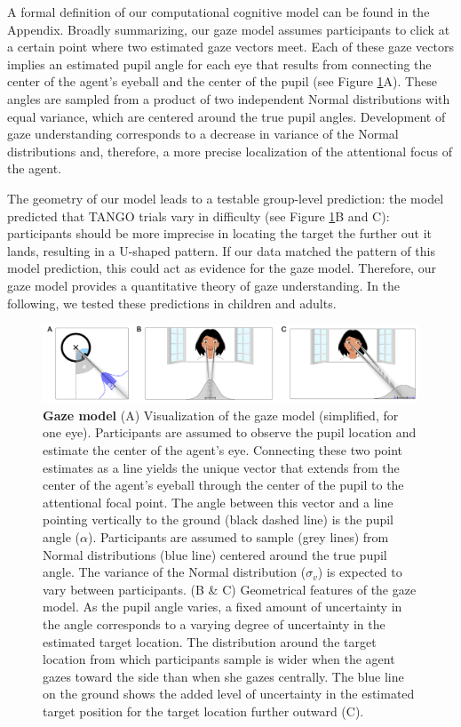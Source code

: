 \documentclass[
  man,mask,floatsintext]{apa7}
\begin{document}
A formal definition of our computational cognitive model can be found in the Appendix. Broadly summarizing, our gaze model assumes participants to click at a certain point where two estimated gaze vectors meet. Each of these gaze vectors implies an estimated pupil angle for each eye that results from connecting the center of the agent's eyeball and the center of the pupil (see Figure \ref{fig:fig2}A). These angles are sampled from a product of two independent Normal distributions with equal variance, which are centered around the true pupil angles. Development of gaze understanding corresponds to a decrease in variance of the Normal distributions and, therefore, a more precise localization of the attentional focus of the agent.

The geometry of our model leads to a testable group-level prediction: the model predicted that TANGO trials vary in difficulty (see Figure \ref{fig:fig2}B and C): participants should be more imprecise in locating the target the further out it lands, resulting in a U-shaped pattern. If our data matched the pattern of this model prediction, this could act as evidence for the gaze model. Therefore, our gaze model provides a quantitative theory of gaze understanding. In the following, we tested these predictions in children and adults.



\begin{figure}

{\centering \includegraphics[width=1\linewidth]{../figures/gazemodel} 

}

\caption{\textbf{Gaze model} (A) Visualization of the gaze model (simplified, for one eye). Participants are assumed to observe the pupil location and estimate the center of the agent's eye. Connecting these two point estimates as a line yields the unique vector that extends from the center of the agent's eyeball through the center of the pupil to the attentional focal point. The angle between this vector and a line pointing vertically to the ground (black dashed line) is the pupil angle (\(\alpha\)). Participants are assumed to sample (grey lines) from Normal distributions (blue line) centered around the true pupil angle. The variance of the Normal distribution (\(\sigma_v\)) is expected to vary between participants. (B \& C) Geometrical features of the gaze model. As the pupil angle varies, a fixed amount of uncertainty in the angle corresponds to a varying degree of uncertainty in the estimated target location. The distribution around the target location from which participants sample is wider when the agent gazes toward the side than when she gazes centrally. The blue line on the ground shows the added level of uncertainty in the estimated target position for the target location further outward (C).}\label{fig:fig2}
\end{figure}
\end{document}
